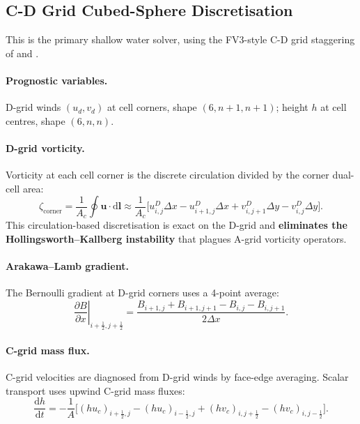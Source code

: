 \documentclass[11pt,twoside]{report}
\newcommand{\dd}{\mathrm{d}}
\newcommand{\pp}{\partial}
\newcommand{\half}{\tfrac{1}{2}}
\newcommand{\vect}[1]{\bm{#1}}
\begin{document}
\subsection{C-D Grid Cubed-Sphere Discretisation}

This is the primary shallow water solver, using the FV3-style C-D grid
staggering of \citet{Lin2004} and \citet{PutmanLin2007}.

\paragraph{Prognostic variables.}
D-grid winds $(u_d,v_d)$ at cell corners, shape $(6,n\!+\!1,n\!+\!1)$;
height $h$ at cell centres, shape $(6,n,n)$.

\paragraph{D-grid vorticity.}
Vorticity at each cell corner is the discrete circulation divided by the
corner dual-cell area:
\begin{equation}
  \zeta_{\mathrm{corner}} = \frac{1}{A_c}\oint\vect{u}\cdot\dd\vect{l}
  \approx \frac{1}{A_c}\bigl[u^D_{i,j}\Delta x - u^D_{i+1,j}\Delta x
  + v^D_{i,j+1}\Delta y - v^D_{i,j}\Delta y\bigr].
\end{equation}
This circulation-based discretisation is exact on the D-grid and
\textbf{eliminates the Hollingsworth--Kallberg instability} that plagues
A-grid vorticity operators.

\paragraph{Arakawa--Lamb gradient.}
The Bernoulli gradient at D-grid corners uses a 4-point average:
\begin{equation}
  \left.\frac{\pp B}{\pp x}\right|_{i+\half,j+\half}
  = \frac{B_{i+1,j}+B_{i+1,j+1}-B_{i,j}-B_{i,j+1}}{2\Delta x}.
\end{equation}

\paragraph{C-grid mass flux.}
C-grid velocities are diagnosed from D-grid winds by face-edge averaging.
Scalar transport uses upwind C-grid mass fluxes:
\begin{equation}
  \frac{\dd h}{\dd t} = -\frac{1}{A}
  \bigl[(hu_c)_{i+\half,j}-(hu_c)_{i-\half,j}
  +(hv_c)_{i,j+\half}-(hv_c)_{i,j-\half}\bigr].
\end{equation}
\end{document}
